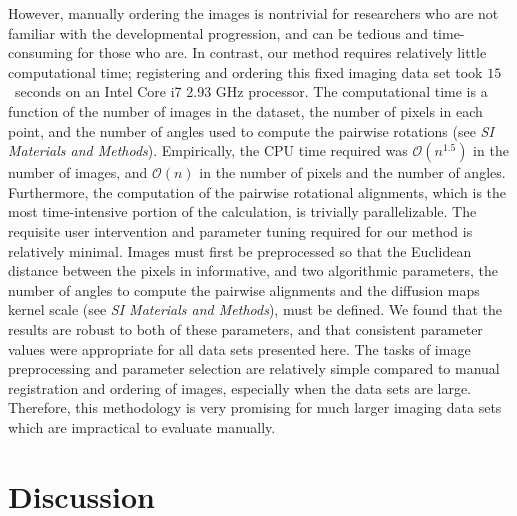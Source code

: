 \documentclass{pnastwo}
\newcommand{\SI}[0]{{\it SI Materials and Methods}}
\begin{document}
\begin{article}
However, manually ordering the images is nontrivial for researchers who are not familiar with the developmental progression, and can be tedious and time-consuming for those who are.
%
In contrast, our method requires relatively little computational time; registering and ordering this fixed imaging data set took $15$~seconds on an Intel Core i7 2.93 GHz processor. %
%
The computational time is a function of the number of images in the dataset, the number of pixels in each point, and the number of angles used to compute the pairwise rotations (see \SI). 
%
Empirically, the CPU time required was $\mathcal{O}(n^{1.5})$ in the number of images, and $\mathcal{O}(n)$ in the number of pixels and the number of angles.
%
Furthermore, the computation of the pairwise rotational alignments, which is the most time-intensive portion of the calculation, is trivially parallelizable.
%
The requisite user intervention and parameter tuning required for our method is relatively minimal.
%
Images must first be preprocessed so that the Euclidean distance between the pixels in informative, and two algorithmic parameters, the number of angles to compute the pairwise alignments and the diffusion maps kernel scale (see \SI), must be defined.
%
We found that the results are robust to both of these parameters, and that consistent parameter values were appropriate for all data sets presented here. 
%
%
The tasks of image preprocessing and parameter selection are relatively simple compared to manual registration and ordering of images, especially when the data sets are large.  
%
Therefore, this methodology is very promising for much larger imaging data sets which are impractical to evaluate manually. 


\section{Discussion}


\end{article}
\end{document}
